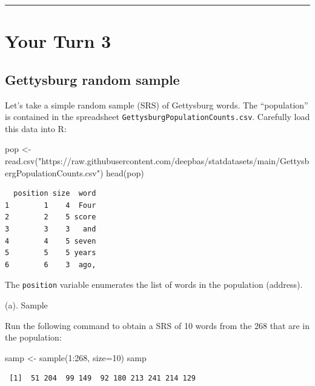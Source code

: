 \documentclass[
]{book}
\newenvironment{Shaded}{\begin{snugshade}}{\end{snugshade}}
\newcommand{\AttributeTok}[1]{\textcolor[rgb]{0.77,0.63,0.00}{#1}}
\newcommand{\DecValTok}[1]{\textcolor[rgb]{0.00,0.00,0.81}{#1}}
\newcommand{\FunctionTok}[1]{\textcolor[rgb]{0.00,0.00,0.00}{#1}}
\newcommand{\NormalTok}[1]{#1}
\newcommand{\OtherTok}[1]{\textcolor[rgb]{0.56,0.35,0.01}{#1}}
\newcommand{\SpecialCharTok}[1]{\textcolor[rgb]{0.00,0.00,0.00}{#1}}
\newcommand{\StringTok}[1]{\textcolor[rgb]{0.31,0.60,0.02}{#1}}
\begin{document}
\begin{center}\rule{0.5\linewidth}{0.5pt}\end{center}

\hypertarget{your-turn-3}{%
\section{Your Turn 3}\label{your-turn-3}}

\hypertarget{gettysburg-random-sample}{%
\subsection{Gettysburg random sample}\label{gettysburg-random-sample}}

Let's take a simple random sample (SRS) of Gettysburg words. The ``population'' is contained in the
spreadsheet \texttt{GettysburgPopulationCounts.csv}. Carefully load this data into R:

\begin{Shaded}
\begin{Highlighting}[]
\NormalTok{pop }\OtherTok{\textless{}{-}} \FunctionTok{read.csv}\NormalTok{(}\StringTok{"https://raw.githubusercontent.com/deepbas/statdatasets/main/GettysbergPopulationCounts.csv"}\NormalTok{)}
\FunctionTok{head}\NormalTok{(pop)}
\end{Highlighting}
\end{Shaded}

\begin{verbatim}
  position size  word
1        1    4  Four
2        2    5 score
3        3    3   and
4        4    5 seven
5        5    5 years
6        6    3  ago,
\end{verbatim}

The \texttt{position} variable enumerates the list of words in the population (address).

(a). Sample

Run the following command to obtain a SRS of 10 words from the 268 that are in the population:

\begin{Shaded}
\begin{Highlighting}[]
\NormalTok{samp }\OtherTok{\textless{}{-}} \FunctionTok{sample}\NormalTok{(}\DecValTok{1}\SpecialCharTok{:}\DecValTok{268}\NormalTok{, }\AttributeTok{size=}\DecValTok{10}\NormalTok{)}
\NormalTok{samp}
\end{Highlighting}
\end{Shaded}

\begin{verbatim}
 [1]  51 204  99 149  92 180 213 241 214 129
\end{verbatim}
\end{document}
